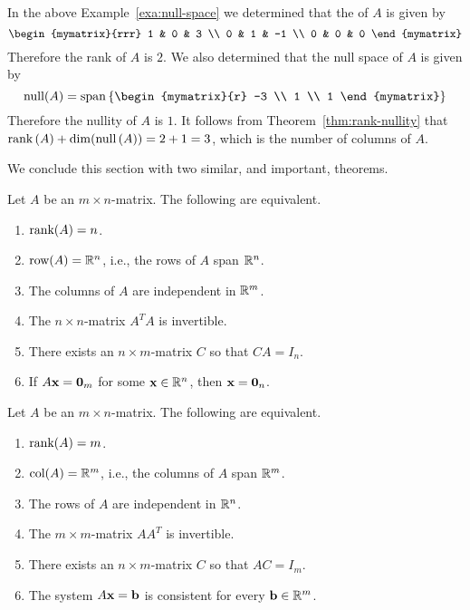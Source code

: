 \begin{solution}
  In the above Example~\ref{exa:null-space} we determined that the
  {\rref} of $A$ is given by
  \begin{equation*}
    \begin{mymatrix}{rrr}
      1 & 0 & 3 \\
      0 & 1 & -1  \\
      0 & 0 & 0
    \end{mymatrix}
  \end{equation*}
  Therefore the rank of $A$ is $2$. We also determined that the null
  space of $A$ is given by
  \begin{equation*}
    \func{null} (A) = \sspan \set{\begin{mymatrix}{r}
        -3 \\
        1 \\
        1
      \end{mymatrix}
    }
  \end{equation*}
  Therefore the nullity of $A$ is $1$. It follows from
  Theorem~\ref{thm:rank-nullity} that
  $\mbox{\rm rank}\left(A\right) + \dim( \mbox{\rm null}\left(A\right)) = 2 + 1 = 3$, which
  is the number of columns of $A$.
\end{solution}

We conclude this section with two similar, and important, theorems.

\begin{theorem}{}{}
  Let $A$ be an $m\times n$-matrix.
  The following are equivalent.
  \begin{enumerate}
  \item $\mbox{\rm rank}(A)=n$.
  \item $\mbox{\rm row}(A)=\mathbb{R}^n$, i.e., the rows of $A$ span $\mathbb{R}^n$.
  \item The columns of $A$ are independent in $\mathbb{R}^m$.
  \item The $n\times n$-matrix $A^TA$ is invertible.
  \item There exists an $n\times m$-matrix $C$ so that $CA=I_n$.
  \item If $A\mbox{\bf x}=\mbox{\bf 0}_m$ for some $\mbox{\bf x}\in\mathbb{R}^n$,
    then $\mbox{\bf x}=\mbox{\bf 0}_n$.
  \end{enumerate}
\end{theorem}

\begin{theorem}{}{}
  Let $A$ be an $m\times n$-matrix.
  The following are equivalent.
  \begin{enumerate}
  \item $\mbox{\rm rank}(A)=m$.
  \item $\mbox{\rm col}(A)=\mathbb{R}^m$, i.e., the columns of $A$ span $\mathbb{R}^m$.
  \item The rows of $A$ are independent in $\mathbb{R}^n$.
  \item The $m\times m$-matrix $AA^T$ is invertible.
  \item There exists an $n\times m$-matrix $C$ so that $AC=I_m$.
  \item The system $A\mbox{\bf x}=\mbox{\bf b}$ is consistent for
    every $\mbox{\bf b}\in\mathbb{R}^m$.
  \end{enumerate}
\end{theorem}
